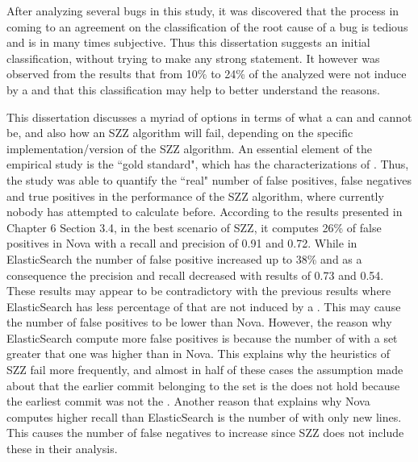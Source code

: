 \documentclass[a4paper, 12pt]{book}
\begin{document}
After analyzing several bugs in this study, it was discovered that the process in coming to an agreement on the classification of the root cause of a bug is tedious and is in many times subjective. Thus this dissertation suggests an initial classification, without trying to make any strong statement. It however was observed from the results that from 10\% to 24\%  of the analyzed \BFC were not induce by a \BIC and that this classification may help to better understand the reasons. 

This dissertation discusses a myriad of options in terms of what a \BIC can and cannot be, and also how an SZZ algorithm will fail, depending on the specific implementation/version of the SZZ algorithm. An essential element of the empirical study is the ``gold standard", which has the characterizations of \BIC. Thus, the study was able to quantify the ``real" number of false positives, false negatives and true positives in the performance of the SZZ algorithm, where currently nobody has attempted to calculate before. According to the results presented in Chapter 6 Section 3.4, in the best scenario of SZZ, it computes 26\% of false positives in Nova  with a recall and precision of 0.91 and 
0.72. While in ElasticSearch the number of false positive increased up to 38\% and as a consequence the precision and recall decreased with results of 0.73 and 0.54. 
These results may appear to be contradictory with the previous results where ElasticSearch has less percentage of \BFC that are not induced by a \BIC. This may cause the number of false positives to be lower than Nova. However, the reason why ElasticSearch compute more false positives is because the number of \BFC with a \PC set greater that one was higher than in Nova. This explains why the heuristics of SZZ fail more frequently, and almost in half of these cases the assumption made about that the earlier commit belonging to the \PC set is the \BIC does not hold because the earliest commit was not the \BIC. Another reason that explains why Nova computes higher recall than ElasticSearch is the number of \BFC with only new lines. This causes the number of false negatives to increase since SZZ does not include these \BFC in their analysis.
\end{document}
